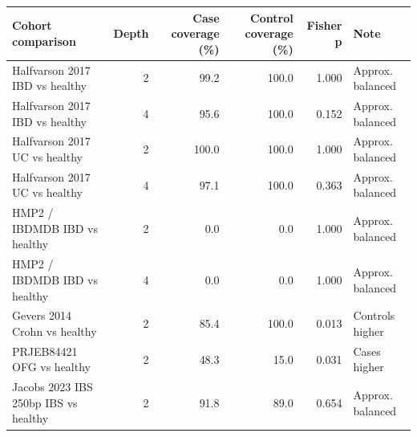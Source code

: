 \begin{center}
\tiny
\begin{tabularx}{\textwidth}{@{} l r r r r Y @{}}
\toprule
Cohort comparison & Depth & Case coverage (\%) & Control coverage (\%) & Fisher p & Note
 \\
\midrule
Halfvarson 2017 IBD vs healthy & 2 & 99.2 & 100.0 & 1.000 & Approx. balanced \\
Halfvarson 2017 IBD vs healthy & 4 & 95.6 & 100.0 & 0.152 & Approx. balanced \\
Halfvarson 2017 UC vs healthy & 2 & 100.0 & 100.0 & 1.000 & Approx. balanced \\
Halfvarson 2017 UC vs healthy & 4 & 97.1 & 100.0 & 0.363 & Approx. balanced \\
HMP2 / IBDMDB IBD vs healthy & 2 & 0.0 & 0.0 & 1.000 & Approx. balanced \\
HMP2 / IBDMDB IBD vs healthy & 4 & 0.0 & 0.0 & 1.000 & Approx. balanced \\
Gevers 2014 Crohn vs healthy & 2 & 85.4 & 100.0 & 0.013 & Controls higher \\
PRJEB84421 OFG vs healthy & 2 & 48.3 & 15.0 & 0.031 & Cases higher \\
Jacobs 2023 IBS 250bp IBS vs healthy & 2 & 91.8 & 89.0 & 0.654 & Approx. balanced \\
\bottomrule
\end{tabularx}
\end{center}
